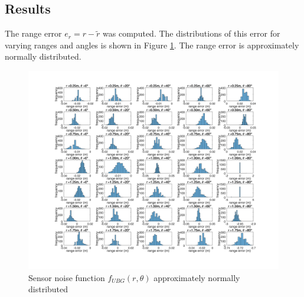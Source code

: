 	\subsection{Results}
		The range error $e_r = r - \tilde{r}$ was computed. The distributions of this error for varying ranges and angles is shown in Figure \ref{fig:mean_hist}. The range error is approximately normally distributed.
		\begin{figure}
		\centering
		  \includegraphics[width=1\textwidth,trim = 0mm 0mm 0mm 0mm,clip]{./Figures/range_error_histograms.jpg}
		  \caption{Sensor noise function $f_{UBG}(r,\theta)$ approximately normally distributed}
		  \label{fig:mean_hist}
		\end{figure}
		
